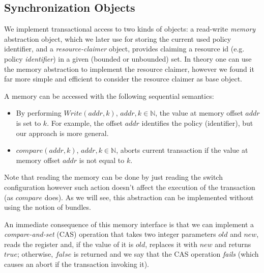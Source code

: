 \documentclass[conference]{sigcomm-alternate}
\newcommand{\Nat}{\mathbb{N}}
\newcommand{\compare}{compare\xspace}
\begin{document}
\subsection{Synchronization Objects}\label{sec:t-if}

We implement transactional access to  two kinds of objects: a read-write \emph{memory} abstraction
object, which we later use for storing the current used policy identifier, and a
\emph{resource-claimer} object, provides claiming a resource id (e.g. policy \emph{identifier}) in a
given (bounded or unbounded) set.
In theory one can use the memory abstraction to implement the resource claimer, 
however we found it far more simple and efficient to consider the resource claimer as base object.
%


A memory can be accessed with the following sequential
semantics:

\begin{itemize}
\item By performing $\textit{Write}(addr,k)$,
  $addr,k\in\Nat$, the value at memory offset $addr$ is set to $k$. For
  example, the offset $addr$ identifies the policy (identifier), 
  but our approach is more general.

\item $\textit{\compare}(addr,k)$, $addr,k\in\Nat$,
aborts current transaction if the value at memory offset $addr$ is not equal to $k$.

\end{itemize}

Note that reading the memory can be done by just reading the switch configuration however such action doesn't affect the execution of the transaction (as $\textit{\compare}$ does).
As we will see, this abstraction can be implemented
without using the notion of bundles.

An immediate consequence of this memory interface is 
that we can implement a \emph{compare-and-set} (CAS) operation that takes two integer parameters
$\textit{old}$ and $\textit{new}$, reads the register and, if the
value of it is $\textit{old}$, replaces it with $\textit{new}$ and
returns $\textit{true}$; otherwise, $\textit{false}$ is returned and
we say that the CAS operation \emph{fails} (which causes an abort if
the transaction invoking it).
\end{document}
